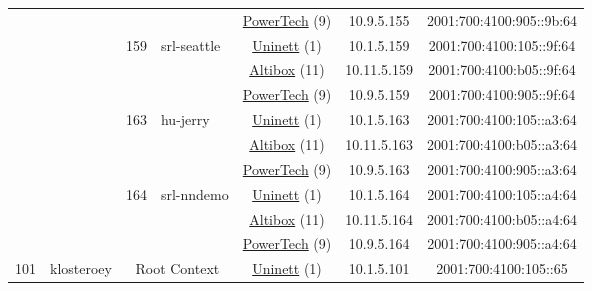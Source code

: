 \begin{small}
\begin{center}
\begin{longtable}{|c|c|c|c|c|c|c|c|}
  &  &  &  & \multicolumn{2}{|c|}{\tiny{\href{http://www.powertech.no}{PowerTech} (9)}} & \tiny{10.9.5.155} & \tiny{2001:700:4100:905::9b:64} \\* \cline{3-3}\cline{4-4}\cline{5-5}\cline{6-6}\cline{7-7}\cline{8-8}
  &  & \multirow{3}{*}{\tiny{159}} & \multicolumn{1}{|l|}{\multirow{3}{*}{\tiny{srl-seattle}}} & \multicolumn{2}{|c|}{\tiny{\href{https://www.uninett.no}{Uninett} (1)}} & \tiny{10.1.5.159} & \tiny{2001:700:4100:105::9f:64} \\* \cline{5-5}\cline{6-6}\cline{7-7}\cline{8-8}
  &  &  &  & \multicolumn{2}{|c|}{\tiny{\href{https://www.altibox.no}{Altibox} (11)}} & \tiny{10.11.5.159} & \tiny{2001:700:4100:b05::9f:64} \\* \cline{5-5}\cline{6-6}\cline{7-7}\cline{8-8}
  &  &  &  & \multicolumn{2}{|c|}{\tiny{\href{http://www.powertech.no}{PowerTech} (9)}} & \tiny{10.9.5.159} & \tiny{2001:700:4100:905::9f:64} \\* \cline{3-3}\cline{4-4}\cline{5-5}\cline{6-6}\cline{7-7}\cline{8-8}
  &  & \multirow{3}{*}{\tiny{163}} & \multicolumn{1}{|l|}{\multirow{3}{*}{\tiny{hu-jerry}}} & \multicolumn{2}{|c|}{\tiny{\href{https://www.uninett.no}{Uninett} (1)}} & \tiny{10.1.5.163} & \tiny{2001:700:4100:105::a3:64} \\* \cline{5-5}\cline{6-6}\cline{7-7}\cline{8-8}
  &  &  &  & \multicolumn{2}{|c|}{\tiny{\href{https://www.altibox.no}{Altibox} (11)}} & \tiny{10.11.5.163} & \tiny{2001:700:4100:b05::a3:64} \\* \cline{5-5}\cline{6-6}\cline{7-7}\cline{8-8}
  &  &  &  & \multicolumn{2}{|c|}{\tiny{\href{http://www.powertech.no}{PowerTech} (9)}} & \tiny{10.9.5.163} & \tiny{2001:700:4100:905::a3:64} \\* \cline{3-3}\cline{4-4}\cline{5-5}\cline{6-6}\cline{7-7}\cline{8-8}
  &  & \multirow{3}{*}{\tiny{164}} & \multicolumn{1}{|l|}{\multirow{3}{*}{\tiny{srl-nndemo}}} & \multicolumn{2}{|c|}{\tiny{\href{https://www.uninett.no}{Uninett} (1)}} & \tiny{10.1.5.164} & \tiny{2001:700:4100:105::a4:64} \\* \cline{5-5}\cline{6-6}\cline{7-7}\cline{8-8}
  &  &  &  & \multicolumn{2}{|c|}{\tiny{\href{https://www.altibox.no}{Altibox} (11)}} & \tiny{10.11.5.164} & \tiny{2001:700:4100:b05::a4:64} \\* \cline{5-5}\cline{6-6}\cline{7-7}\cline{8-8}
  &  &  &  & \multicolumn{2}{|c|}{\tiny{\href{http://www.powertech.no}{PowerTech} (9)}} & \tiny{10.9.5.164} & \tiny{2001:700:4100:905::a4:64} \\ \hline
 \multirow{27}{*}{\tiny{101}} & \multicolumn{1}{|l|}{\multirow{27}{*}{\tiny{klosteroey}}} & \multicolumn{2}{|c|}{\multirow{3}{*}{\tiny{Root Context}}} & \multicolumn{2}{|c|}{\tiny{\href{https://www.uninett.no}{Uninett} (1)}} & \tiny{10.1.5.101} & \tiny{2001:700:4100:105::65} \\* \cline{5-5}\cline{6-6}\cline{7-7}\cline{8-8}

\end{longtable}
\end{center}
\end{small}
